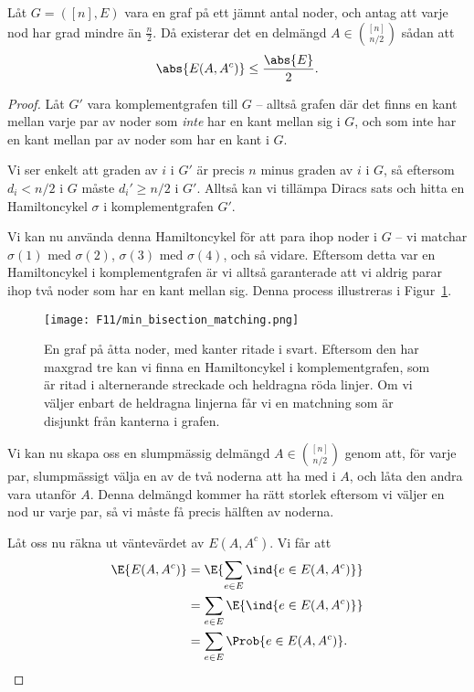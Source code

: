 \documentclass[nobib]{tufte-handout}
\begin{document}
\begin{proposition}
  Låt $G = ([n], E)$ vara en graf på ett jämnt antal noder, och antag att varje nod har grad mindre än $\frac{n}{2}$. Då existerar det en delmängd $A \in \binom{[n]}{n/2}$ sådan att
  $$\abs{E(A, A^c)} \leq \frac{\abs{E}}{2}.$$ 

  \begin{proof}
    Låt $G'$ vara komplementgrafen till $G$ -- alltså grafen där det finns en kant mellan varje par av noder som \emph{inte} har en kant mellan sig i $G$, och som inte har en kant mellan par av noder som har en kant i $G$.

    Vi ser enkelt att graden av $i$ i $G'$ är precis $n$ minus graden av $i$ i $G$, så eftersom $d_i < n/2$ i $G$ måste $d_i' \geq n/2$ i $G'$. Alltså kan vi tillämpa Diracs sats och hitta en Hamiltoncykel $\sigma$ i komplementgrafen $G'$.

    Vi kan nu använda denna Hamiltoncykel för att para ihop noder i $G$ -- vi matchar $\sigma(1)$ med $\sigma(2)$, $\sigma(3)$ med $\sigma(4)$, och så vidare. Eftersom detta var en Hamiltoncykel i komplementgrafen är vi alltså garanterade att vi aldrig parar ihop två noder som har en kant mellan sig. Denna process illustreras i Figur~\ref{fig:min_bisection_matching}.

    \begin{figure}
      \centering
      \texttt{[image: F11/min\_bisection\_matching.png]}
      \caption{En graf på åtta noder, med kanter ritade i svart. Eftersom den har maxgrad tre kan vi finna en Hamiltoncykel i komplementgrafen, som är ritad i alternerande streckade och heldragna röda linjer. Om vi väljer enbart de heldragna linjerna får vi en matchning som är disjunkt från kanterna i grafen.}
      \label{fig:min_bisection_matching}
    \end{figure}

    Vi kan nu skapa oss en slumpmässig delmängd $A \in \binom{[n]}{n/2}$ genom att, för varje par, slumpmässigt välja en av de två noderna att ha med i $A$, och låta den andra vara utanför $A$. Denna delmängd kommer ha rätt storlek eftersom vi väljer en nod ur varje par, så vi måste få precis hälften av noderna.

    Låt oss nu räkna ut väntevärdet av $E(A, A^c)$. Vi får att
    \begin{align*}
      \E{E(A, A^c)} &= \E{\sum_{e \in E} \ind{e \in E(A, A^c)}}\\
      &= \sum_{e \in E} \E{\ind{e \in E(A, A^c)}}\\
      &= \sum_{e \in E} \Prob{e \in E(A, A^c)}.
    \end{align*}


\end{proof}
\end{proposition}
\end{document}
